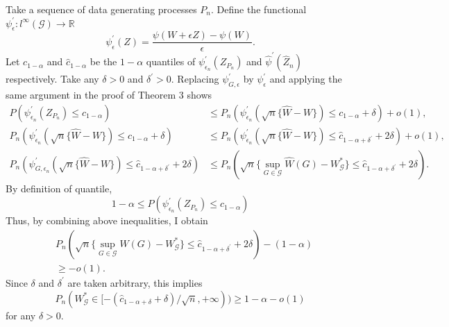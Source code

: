 \documentclass[12pt,oneside,reqno,english]{amsart}
\theoremstyle{definition}
\begin{document}
Take a sequence of data generating processes $P_{n}$. 
Define the functional $\psi^{\prime}_{\epsilon}:l^{\infty}(\mathcal{G})\rightarrow \mathbb{R}$ 
\[\psi^{\prime}_{\epsilon}(Z)=\frac{\psi(W+\epsilon Z)-\psi(W)}{\epsilon}.\]
Let $c_{1-\alpha}$ and $\hat{c}_{1-\alpha}$ be 
the $1-\alpha$ quantiles of $\psi^{\prime}_{\epsilon_{n}}(Z_{P_{n}})$ and $\hat{\psi}^{\prime}(\hat{Z}_{n})$ respectively.
Take any $\delta>0$ and $\delta^{\prime}>0$.
Replacing $\psi^{\prime}_{G,\epsilon}$ by $\psi^{\prime}_{\epsilon}$ and applying the same argument in the proof of Theorem 3 shows 
\begin{align*}
P(\psi^{\prime}_{\epsilon_{n}}(Z_{P_{n}})\leq c_{1-\alpha})&\leq P_{n}( \psi^{\prime}_{\epsilon_{n}}(\sqrt{n}\{\hat{W}-W\}) \leq c_{1-\alpha}+\delta)+o(1),\\
P_{n}( \psi^{\prime}_{\epsilon_{n}}(\sqrt{n}\{\hat{W}-W\}) \leq c_{1-\alpha}+\delta)&\leq 
P_{n}( \psi^{\prime}_{\epsilon_{n}}(\sqrt{n}\{\hat{W}-W\}) \leq \hat{c}_{1-\alpha+\delta^{\prime}}+2\delta)+o(1),\\
P_{n}( \psi^{\prime}_{G,\epsilon_{n}}(\sqrt{n}\{\hat{W}-W\}) \leq \hat{c}_{1-\alpha+\delta^{\prime}}+2\delta)&\leq 
P_{n}(\sqrt{n}\{\sup_{G\in \mathcal{G}}\hat{W}(G)-W^{*}_{\mathcal{G}}\}\leq \hat{c}_{1-\alpha+\delta^{\prime}}+2\delta).
\end{align*}
By definition of quantile,
\[1-\alpha \leq P(\psi^{\prime}_{\epsilon_{n}}(Z_{P_{n}})\leq c_{1-\alpha})\]
Thus, by combining above inequalities, I obtain 
\begin{align*}
&P_{n}(\sqrt{n}\{\sup_{G\in \mathcal{G}}W(G)-W^{*}_{\mathcal{G}}\}\leq \hat{c}_{1-\alpha+\delta^{\prime}}+2\delta)-(1-\alpha)\\
&\geq -o(1).
\end{align*}
Since $\delta$ and $\delta^{\prime}$ are taken arbitrary, 
this implies 
\[P_{n}(W^{*}_{\mathcal{G}}\in [-(\hat{c}_{1-\alpha+\delta}+\delta)/\sqrt{n}, +\infty ) )\geq 1-\alpha-o(1)\]
for any $\delta>0$. 
\end{document}
